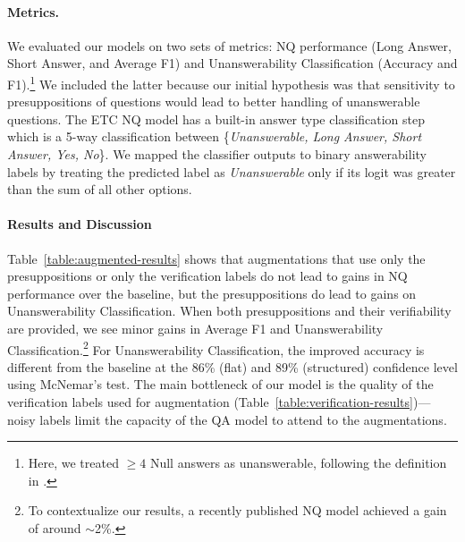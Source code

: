 \documentclass[11pt,a4paper]{article}
\begin{document}
\paragraph{Metrics.} We evaluated our models on two sets of metrics: NQ performance (Long Answer, Short Answer, and Average F1) and Unanswerability Classification (Accuracy and F1).\footnote{Here, we treated $\geq 4$ Null answers as unanswerable, following the definition in \citet{kwiatkowski-etal-2019-natural}.} We included the latter because our initial hypothesis was that sensitivity to presuppositions of questions would lead to better handling of unanswerable questions. The ETC NQ model has a built-in answer type classification step which is a 5-way classification between \{\textit{Unanswerable, Long Answer, Short Answer, Yes, No}\}. We mapped the classifier outputs to binary answerability labels by treating the predicted label as \textit{Unanswerable} only if its logit was greater than the sum of all other options.

\paragraph{Results and Discussion}
Table~\ref{table:augmented-results} shows that augmentations that use only the presuppositions or only the verification labels do not lead to gains in NQ performance over the baseline, but the presuppositions do lead to gains on Unanswerability Classification. When both presuppositions and their verifiability are provided, we see minor gains in Average F1 and Unanswerability Classification.\footnote{To contextualize our results, a recently published NQ model \citep{ainslie2020etc} achieved a gain of around $\sim$2\%.} For Unanswerability Classification, the improved accuracy is different from the baseline at the 86\% (flat) and 89\% (structured) confidence level using McNemar's test.  
The main bottleneck of our model is the quality of the verification labels used for augmentation (Table~\ref{table:verification-results})---noisy labels limit the capacity of the QA model to attend to the augmentations.
\end{document}
